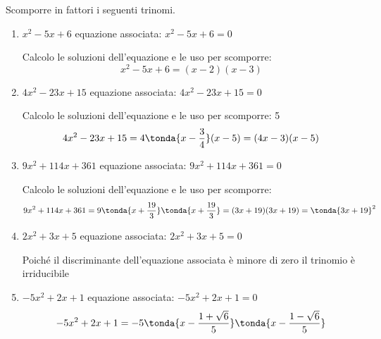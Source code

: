 \begin{esempio}{}{}
Scomporre in fattori i seguenti trinomi.
\begin{enumerate}[left=0mm]
\item \(x^2 -5 x +6\) \quad equazione associata: \(x^2 -5x +6 = 0\)

Calcolo le soluzioni dell'equazione e le uso per scomporre: 
\[x^2 -5 x +6 = (x -2)(x -3)\]

\item \(4x^2 -23x +15\) \quad equazione associata: \(4x^2 -23x +15 = 0\)

Calcolo le soluzioni dell'equazione e le uso per scomporre: 
      {}{5}
\[4x^2 -23x +15 = 4\tonda{x -\dfrac{3}{4}} (x -5) = (4x -3)(x -5)\]

\item \(9x^2 +114x +361\) \quad equazione associata: 
\(9x^2 +114x +361 = 0\)

Calcolo le soluzioni dell'equazione e le uso per scomporre: 
      {}{}
\[9x^2 +114x +361 = 9 \tonda{x +\dfrac{19}{3}} \tonda{x +\dfrac{19}{3}} = 
(3x +19)(3x +19)= \tonda{3x+19}^2\]

\item \(2x^2 +3x +5\) \quad equazione associata: \(2x^2 +3x +5 = 0\)

            {}
Poiché il discriminante dell'equazione associata è minore di zero il 
trinomio è irriducibile

\item \(-5x^2 +2x +1\) \quad equazione associata: \(-5x^2 +2x +1 = 0\) 
      {}{}
\[-5x^2 +2x +1 = 
-5 \tonda{x -\dfrac{1 + \sqrt{6}}{5}} \tonda{x -\dfrac{1 - \sqrt{6}}{5}}\]
\end{enumerate}
\end{esempio}
% 
% 
